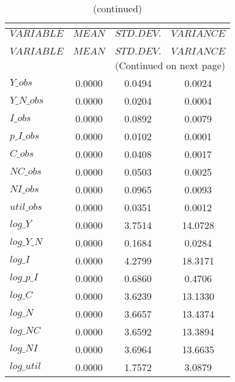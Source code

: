  
\begin{center}
\begin{longtable}{lccc} 
\caption{THEORETICAL MOMENTS}\\
 \label{Table:th_moments}\\
\toprule 
$VARIABLE   $	 & 	 $         MEAN$	 & 	 $    STD. DEV.$	 & 	 $     VARIANCE$\\
\midrule \endfirsthead 
\caption{(continued)}\\
 \toprule \\ 
$VARIABLE   $	 & 	 $         MEAN$	 & 	 $    STD. DEV.$	 & 	 $     VARIANCE$\\
\midrule \endhead 
\midrule \multicolumn{4}{r}{(Continued on next page)} \\ \bottomrule \endfoot 
\bottomrule \endlastfoot 
$Y\_obs     $	 & 	       0.0000	 & 	       0.0494	 & 	       0.0024 \\ 
$Y\_N\_obs  $	 & 	       0.0000	 & 	       0.0204	 & 	       0.0004 \\ 
$I\_obs     $	 & 	       0.0000	 & 	       0.0892	 & 	       0.0079 \\ 
$p\_I\_obs  $	 & 	       0.0000	 & 	       0.0102	 & 	       0.0001 \\ 
$C\_obs     $	 & 	       0.0000	 & 	       0.0408	 & 	       0.0017 \\ 
$NC\_obs    $	 & 	       0.0000	 & 	       0.0503	 & 	       0.0025 \\ 
$NI\_obs    $	 & 	       0.0000	 & 	       0.0965	 & 	       0.0093 \\ 
$util\_obs  $	 & 	       0.0000	 & 	       0.0351	 & 	       0.0012 \\ 
$log\_Y     $	 & 	       0.0000	 & 	       3.7514	 & 	      14.0728 \\ 
$log\_Y\_N  $	 & 	       0.0000	 & 	       0.1684	 & 	       0.0284 \\ 
$log\_I     $	 & 	       0.0000	 & 	       4.2799	 & 	      18.3171 \\ 
$log\_p\_I  $	 & 	       0.0000	 & 	       0.6860	 & 	       0.4706 \\ 
$log\_C     $	 & 	       0.0000	 & 	       3.6239	 & 	      13.1330 \\ 
$log\_N     $	 & 	       0.0000	 & 	       3.6657	 & 	      13.4374 \\ 
$log\_NC    $	 & 	       0.0000	 & 	       3.6592	 & 	      13.3894 \\ 
$log\_NI    $	 & 	       0.0000	 & 	       3.6964	 & 	      13.6635 \\ 
$log\_util  $	 & 	       0.0000	 & 	       1.7572	 & 	       3.0879 \\ 
\end{longtable}
 \end{center}
